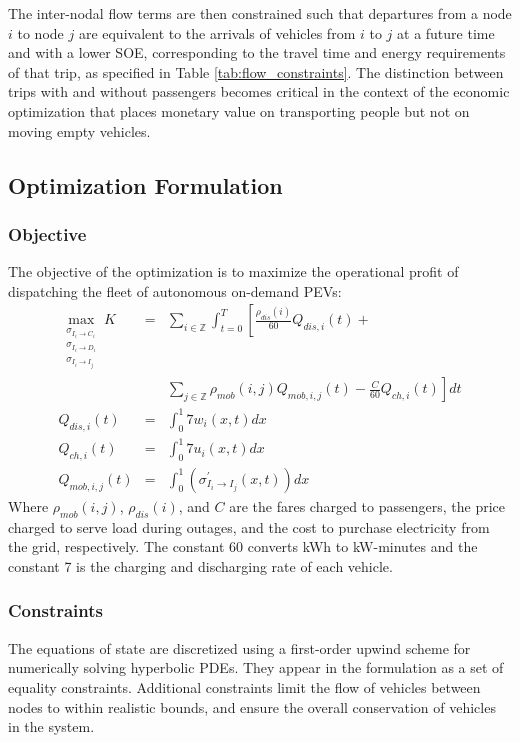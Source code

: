 \documentclass[journal]{IEEEtran}
\begin{document}
The inter-nodal flow terms are then constrained such that departures from a node $i$ to node $j$ are equivalent to the arrivals of vehicles from $i$ to $j$ at a future time and with a lower SOE, corresponding to the travel time and energy requirements of that trip, as specified in Table \ref{tab:flow_constraints}. The distinction between trips with and without passengers becomes critical in the context of the economic optimization that places monetary value on transporting people but not on moving empty vehicles.

\subsection{Optimization Formulation}

\subsubsection{Objective}
The objective of the optimization is to maximize the operational profit of dispatching the fleet of autonomous on-demand PEVs:
\begin{eqnarray*}
  \max_{\substack{\sigma_{I_i \rightarrow C_i} \\
    \sigma_{I_i \rightarrow D_i} \\ 
    \sigma_{I_i \rightarrow I_j}}}
    K &=& \sum_{i\in\mathbb{Z}} \int_{t=0}^{T} \left[ \frac{\rho_{dis}(i)}{60} Q_{dis,i}(t) + \right. \\ 
      && \left. \sum_{j\in\mathbb{Z}}\rho_{mob}(i,j)Q_{mob,i,j}(t)  - \frac{C}{60}Q_{ch,i}(t) \right]dt\\
    Q_{dis,i}(t) & = & \int_{0}^{1} 7 w_i(x,t) dx \\
    Q_{ch,i}(t) & = & \int_{0}^{1} 7 u_i(x,t) dx \\
    Q_{mob,i,j}(t) & = & \int_{0}^{1}\left( \sigma_{I_i \rightarrow I_j}^\prime(x,t) \right)dx
\end{eqnarray*}
Where $\rho_{mob}(i,j)$, $\rho_{dis}(i)$, and $C$ are the fares charged to passengers, the price charged to serve load during outages, and the cost to purchase electricity from the grid, respectively. The constant 60 converts kWh to kW-minutes and the constant 7 is the charging and discharging rate of each vehicle.

\subsubsection{Constraints}

The equations of state are discretized using a first-order upwind scheme for numerically solving hyperbolic PDEs. They appear in the formulation as a set of equality constraints. Additional constraints limit the flow of vehicles between nodes to within realistic bounds, and ensure the overall conservation of vehicles in the system.
\end{document}
